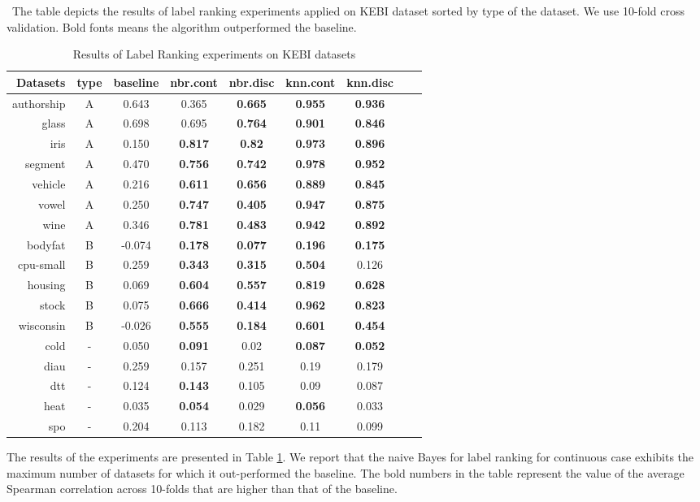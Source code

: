 \begin{table}
\caption{Results of Label Ranking experiments on KEBI datasets}
\label{ch2-results}
\ The table depicts the results of label ranking experiments applied on KEBI dataset sorted by type of the dataset. We use 10-fold cross validation. Bold fonts means the algorithm outperformed the baseline.
\begin{center}
\begin{tabular}{rcccccccc}
\toprule
Datasets & type & baseline & nbr.cont & nbr.disc & knn.cont & knn.disc \\ 
  \midrule 
authorship & A & 0.643 & 0.365 & \textbf{0.665} & \textbf{0.955} & \textbf{0.936} \\ 
  glass & A & 0.698 & 0.695 & \textbf{0.764} & \textbf{0.901} & \textbf{0.846} \\ 
  iris & A & 0.150 & \textbf{0.817} & \textbf{0.82} & \textbf{0.973} & \textbf{0.896} \\ 
  segment & A & 0.470 & \textbf{0.756} & \textbf{0.742} & \textbf{0.978} & \textbf{0.952} \\ 
  vehicle & A & 0.216 & \textbf{0.611} & \textbf{0.656} & \textbf{0.889} & \textbf{0.845} \\ 
  vowel & A & 0.250 & \textbf{0.747} & \textbf{0.405} & \textbf{0.947} & \textbf{0.875} \\ 
  wine & A & 0.346 & \textbf{0.781} & \textbf{0.483} & \textbf{0.942} & \textbf{0.892} \\ 
  bodyfat & B & -0.074 & \textbf{0.178} & \textbf{0.077} & \textbf{0.196} & \textbf{0.175} \\ 
  cpu-small & B & 0.259 & \textbf{0.343} & \textbf{0.315} & \textbf{0.504} & 0.126 \\ 
  housing & B & 0.069 & \textbf{0.604} & \textbf{0.557} & \textbf{0.819} & \textbf{0.628} \\ 
  stock & B & 0.075 & \textbf{0.666} & \textbf{0.414} & \textbf{0.962} & \textbf{0.823} \\ 
  wisconsin & B & -0.026 & \textbf{0.555} & \textbf{0.184} & \textbf{0.601} & \textbf{0.454} \\ 
  cold & - & 0.050 & \textbf{0.091} & 0.02 & \textbf{0.087} & \textbf{0.052} \\ 
  diau & - & 0.259 & 0.157 & 0.251 & 0.19 & 0.179 \\ 
  dtt & - & 0.124 & \textbf{0.143} & 0.105 & 0.09 & 0.087 \\ 
  heat & - & 0.035 & \textbf{0.054} & 0.029 & \textbf{0.056} & 0.033 \\ 
  spo & - & 0.204 & 0.113 & 0.182 & 0.11 & 0.099 \\ 
  
\bottomrule
\end{tabular}%
\end{center}
\end{table}
The results of the experiments are presented in Table \ref{ch2-results}. We report that the naive Bayes for label ranking for continuous case exhibits the maximum number of datasets for which it out-performed the baseline. The bold numbers in the table represent the value of the average Spearman correlation across 10-folds that are higher than that of the baseline.

